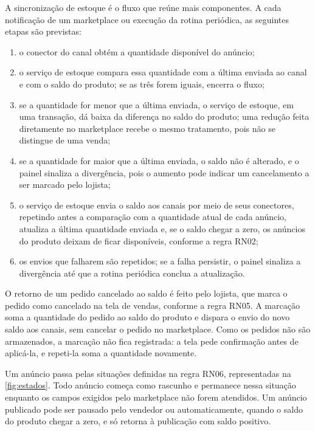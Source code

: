 A sincronização de estoque é o fluxo que reúne mais componentes. A cada notificação de um marketplace ou execução da rotina periódica, as seguintes etapas são previstas:

\begin{enumerate}
  \item o conector do canal obtém a quantidade disponível do anúncio;
  \item o serviço de estoque compara essa quantidade com a última enviada ao canal e com o saldo do produto; se as três forem iguais, encerra o fluxo;
  \item se a quantidade for menor que a última enviada, o serviço de estoque, em uma transação, dá baixa da diferença no saldo do produto; uma redução feita diretamente no marketplace recebe o mesmo tratamento, pois não se distingue de uma venda;
  \item se a quantidade for maior que a última enviada, o saldo não é alterado, e o painel sinaliza a divergência, pois o aumento pode indicar um cancelamento a ser marcado pelo lojista;
  \item o serviço de estoque envia o saldo aos canais por meio de seus conectores, repetindo antes a comparação com a quantidade atual de cada anúncio, atualiza a última quantidade enviada e, se o saldo chegar a zero, os anúncios do produto deixam de ficar disponíveis, conforme a regra RN02;
  \item os envios que falharem são repetidos; se a falha persistir, o painel sinaliza a divergência até que a rotina periódica conclua a atualização.
\end{enumerate}

O retorno de um pedido cancelado ao saldo é feito pelo lojista, que marca o pedido como cancelado na tela de vendas, conforme a regra RN05. A marcação soma a quantidade do pedido ao saldo do produto e dispara o envio do novo saldo aos canais, sem cancelar o pedido no marketplace. Como os pedidos não são armazenados, a marcação não fica registrada: a tela pede confirmação antes de aplicá-la, e repeti-la soma a quantidade novamente.

Um anúncio passa pelas situações definidas na regra RN06, representadas na \autoref{fig:estados}. Todo anúncio começa como rascunho e permanece nessa situação enquanto os campos exigidos pelo marketplace não forem atendidos. Um anúncio publicado pode ser pausado pelo vendedor ou automaticamente, quando o saldo do produto chegar a zero, e só retorna à publicação com saldo positivo.

